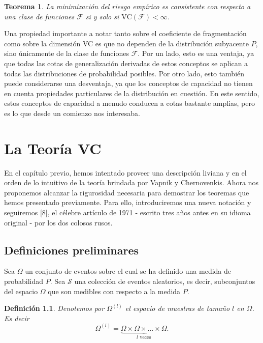 \documentclass{report}
\newtheorem{thm}{Teorema}[section]
\newtheorem{dfn}{Definición}[section]
\begin{document}
\begin{thm}
    La minimización del riesgo empírico es consistente con respecto a una clase de funciones \(\mathcal{F}\) si y solo si
    \(\text{VC}(\mathcal{F}) < \infty\).\newline 
\end{thm}

Una propiedad importante a notar tanto sobre el coeficiente de fragmentación como sobre la 
dimensión VC es que no dependen de la distribución subyacente \( P \), sino únicamente de la 
clase de funciones \(\mathcal{F}\). Por un lado, esto es una ventaja, ya que todas las cotas de 
generalización derivadas de estos conceptos se aplican a todas las distribuciones de probabilidad 
posibles. Por otro lado, esto también puede considerarse una desventaja, ya que los conceptos de 
capacidad no tienen en cuenta propiedades particulares de la distribución en cuestión. En este 
sentido, estos conceptos de capacidad a menudo conducen a cotas bastante amplias, pero es lo que desde
un comienzo nos interesaba.\newline


\chapter{La Teoría VC}

En el capítulo previo, hemos intentado proveer una descripción liviana y en el orden de lo intuitivo de la teoría brindada por 
Vapnik y Chernovenkis. Ahora nos proponemos alcanzar la rigurosidad necesaria para demostrar los teoremas que hemos presentado 
previamente. Para ello, introduciremos una nueva notación y seguiremos [8], el célebre artículo de 1971 - escrito tres años antes en su 
idioma original - por los dos colosos rusos.\newline

\section{Definiciones preliminares}

Sea \( \Omega \) un conjunto de eventos sobre el cual se ha definido una medida de probabilidad \( P \). Sea \( \mathcal{S} \) una colección de eventos 
aleatorios, es decir, subconjuntos del espacio \( \Omega \) que son medibles con respecto 
a la medida \( P \). \newline
\begin{dfn}
    Denotemos por \( \Omega^{(l)} \) el espacio de muestras de tamaño \( l \) en \( \Omega \). Es decir
    \[ \Omega^{(l)} = \underbrace{\Omega \times \Omega \times \ldots \times \Omega}_{l \text{ veces}}. \]
\end{dfn}
\end{document}
